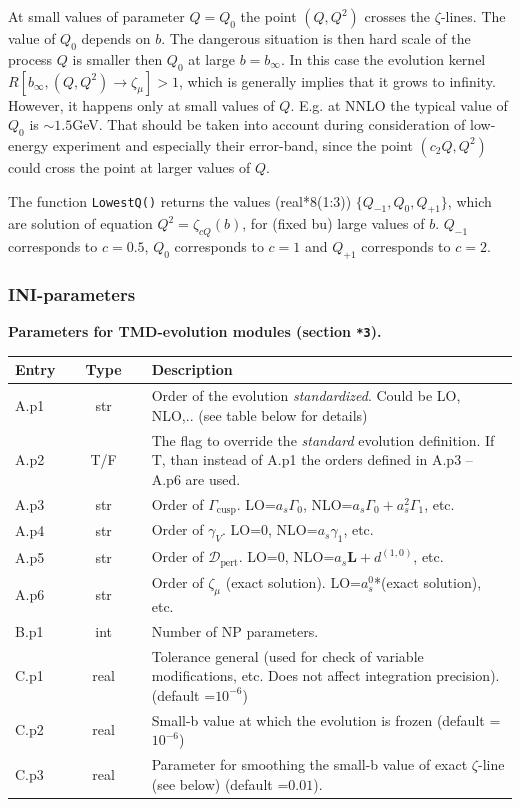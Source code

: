 \documentclass[prd,nofootinbib,eqsecnum,final]{revtex4}
\renewcommand{\(}{\left(}
\renewcommand{\)}{\right)}
\renewcommand{\[}{\left[}
\renewcommand{\]}{\right]}
\begin{document}
At small values of parameter $Q=Q_0$ the point $(Q,Q^2)$ crosses the $\zeta$-lines. The value of $Q_0$ depends on $b$. The dangerous situation is then hard scale of the process $Q$ is smaller then $Q_0$ at large $b=b_\infty$. In this case the evolution kernel $R[b_\infty,(Q,Q^2)\to \zeta_\mu]>1$, which is generally implies that it grows to infinity. However, it happens only at small values of $Q$. E.g. at NNLO the typical value of $Q_0$ is $\sim 1.5$GeV. That should be taken into account during consideration of low-energy experiment and especially their error-band, since the point $(c_2Q,Q^2)$ could cross the point at larger values of $Q$.

The function \texttt{LowestQ()} returns the values (real*8(1:3)) $\{Q_{-1},Q_0,Q_{+1}\}$, which are solution of equation $Q^2=\zeta_{c Q}(b)$, for (fixed bu) large values of $b$. $Q_{-1}$ corresponds to $c=0.5$, $Q_0$ corresponds to $c=1$ and $Q_{+1}$ corresponds to $c=2$.

\subsubsection{INI-parameters}

\begin{center}
\textbf{Parameters for TMD-evolution modules (section \texttt{*3}).} 
\\
\begin{tabular}{||p{1.5cm}||c||p{12.5cm}||}
\hline\hline
Entry &~~Type~~& Description
\\\hline
A.p1 & str & Order of the evolution \textit{standardized}. Could be LO, NLO,.. (see table below for details)
\\\hline
A.p2 & T/F & The flag to override the \textit{standard} evolution definition. If T, than instead of A.p1 the orders defined in A.p3 -- A.p6 are used.
\\\hline
A.p3 & str & Order of $\Gamma_{\text{cusp}}$. LO=$a_s \Gamma_0$, NLO=$a_s \Gamma_0+a_s^2\Gamma_1$, etc.
\\\hline
A.p4 & str & Order of $\gamma_{V}$. LO=0, NLO=$a_s \gamma_1$, etc.
\\\hline
A.p5 & str & Order of $\mathcal{D}_{\text{pert}}$. LO=0, NLO=$a_s \mathbf{L}+d^{(1,0)}$, etc.
\\\hline
A.p6 & str & Order of $\zeta_\mu$ (exact solution). LO=$a_s^0$*(exact solution),  etc.
\\\hline\hline
B.p1 & int & Number of NP parameters.
\\\hline\hline
C.p1 & real & Tolerance general (used for check of variable modifications, etc. Does not affect integration precision). (default =$10^{-6}$)
\\\hline
C.p2 & real & Small-b value at which the evolution is frozen (default =$10^{-6}$)
\\\hline
C.p3 & real & Parameter for smoothing the small-b value of exact $\zeta$-line (see below) (default =$0.01$).
\\\hline\hline
\end{tabular}
\end{center}
\end{document}
